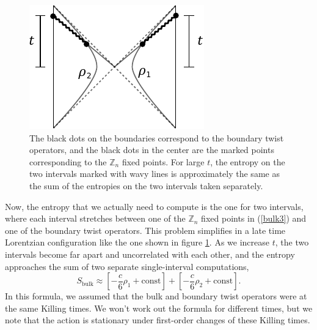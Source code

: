\documentclass[12pt]{article}
\newcommand{\be}{\begin{equation}}
\newcommand{\ee}{\end{equation}}
\numberwithin{equation}{section}
\begin{document}
\begin{figure}[t]
\begin{center}
\includegraphics[scale = 1.2]{images/lorentz.pdf}
\caption{{\small The black dots on the boundaries correspond to the boundary twist operators, and the black dots in the center are the marked points corresponding to the $\mathbb{Z}_n$ fixed points. For large $t$, the entropy on the two intervals marked with wavy lines is approximately the same as the sum of the entropies on the two intervals taken separately.}}\label{fig:lorentz}
\end{center}
\end{figure}
Now, the entropy that we actually need to compute is the one for two intervals, where each interval stretches between one of the $\mathbb{Z}_n$ fixed points in (\ref{bulk3}) and one of the boundary twist operators. This problem simplifies in a late time Lorentzian configuration like the one shown in figure \ref{fig:lorentz}. As we increase $t$, the two intervals become far apart and uncorrelated with each other, and the entropy approaches the sum of two separate single-interval computations,
\be
S_{\text{bulk}} \approx \left[-\frac{c}{6}\rho_1 + \text{const}\right] + \left[-\frac{c}{6}\rho_2 + \text{const}\right].
\ee
In this formula, we assumed that the bulk and boundary twist operators were at the same Killing times. We won't work out the formula for different times, but we note that the action is stationary under first-order changes of these Killing times.
\end{document}
